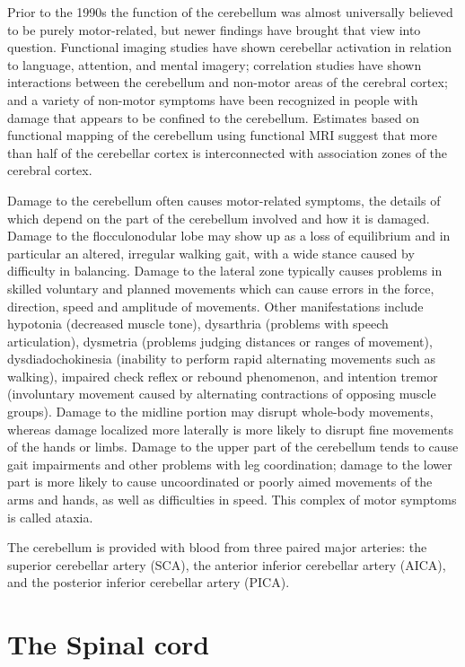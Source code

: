 Prior to the 1990s the function of the cerebellum was almost universally believed to be purely motor-related, but newer findings have brought that view into question. Functional imaging studies have shown cerebellar activation in relation to language, attention, and mental imagery; correlation studies have shown interactions between the cerebellum and non-motor areas of the cerebral cortex; and a variety of non-motor symptoms have been recognized in people with damage that appears to be confined to the cerebellum. Estimates based on functional mapping of the cerebellum using functional MRI suggest that more than half of the cerebellar cortex is interconnected with association zones of the cerebral cortex.

Damage to the cerebellum often causes motor-related symptoms, the details of which depend on the part of the cerebellum involved and how it is damaged. Damage to the flocculonodular lobe may show up as a loss of equilibrium and in particular an altered, irregular walking gait, with a wide stance caused by difficulty in balancing. Damage to the lateral zone typically causes problems in skilled voluntary and planned movements which can cause errors in the force, direction, speed and amplitude of movements. Other manifestations include hypotonia (decreased muscle tone), dysarthria (problems with speech articulation), dysmetria (problems judging distances or ranges of movement), dysdiadochokinesia (inability to perform rapid alternating movements such as walking), impaired check reflex or rebound phenomenon, and intention tremor (involuntary movement caused by alternating contractions of opposing muscle groups). Damage to the midline portion may disrupt whole-body movements, whereas damage localized more laterally is more likely to disrupt fine movements of the hands or limbs. Damage to the upper part of the cerebellum tends to cause gait impairments and other problems with leg coordination; damage to the lower part is more likely to cause uncoordinated or poorly aimed movements of the arms and hands, as well as difficulties in speed. This complex of motor symptoms is called ataxia.

The cerebellum is provided with blood from three paired major arteries: the superior cerebellar artery (SCA), the anterior inferior cerebellar artery (AICA), and the posterior inferior cerebellar artery (PICA).

\hypertarget{the-spinal-cord}{%
\section{The Spinal cord}\label{the-spinal-cord}}

